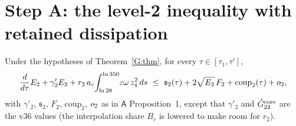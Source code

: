 \documentclass[11pt]{article}
\begin{document}
\section{Step A: the level-2 inequality with retained dissipation}\label{G:sec:A}
\begin{proposition}\label{G:prop}
Under the hypotheses of Theorem~\ref{G:thm}, for every $\tau\in[\tau_1,\tau']$,
\begin{equation}\label{G:eq:D1}
\frac{d}{d\tau}E_2+\gamma'_2E_2+r_2\,a_c\!\int_{\ln28}^{\ln350}\!\varepsilon\omega\,z_4^2\,ds\ \le\ \mathfrak s_2(\tau)+2\sqrt{E_2}\,F_2+\mathrm{coup}_2(\tau)+\oh_2 ,
\end{equation}
with $\gamma'_2$, $\mathfrak s_2$, $F_2$, $\mathrm{coup}_2$, $o_2$ as in $\mathsf A$ Proposition~1, except that $\gamma'_2$ and $\hat G^{\rm core}_{22}$ are the v36 values (the interpolation share $B_c$ is lowered to make room for $r_2$).
\end{proposition}
\end{document}
